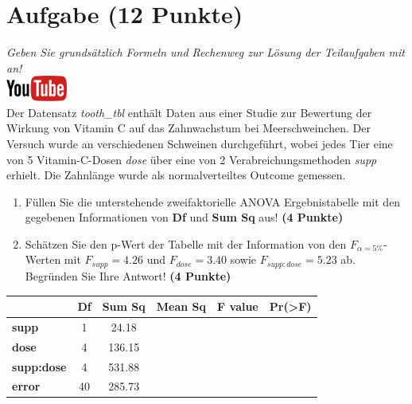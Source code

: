 \documentclass[a4paper, 9pt]{scrartcl}\usepackage[]{graphicx}\usepackage[]{xcolor}
\begin{document}
 
\clearpage

\section{Aufgabe \hfill (12 Punkte)}

\textit{Geben Sie grunds{\"a}tzlich Formeln und Rechenweg zur L{\"o}sung der
  Teilaufgaben mit an!} \\[1Ex]

\hfill\href{https://youtu.be/8Pb2sKUIMyk}{\includegraphics[width =
  2cm]{img/youtube}}\\[1Ex]



Der Datensatz \textit{tooth\_tbl} enth{\"a}lt Daten aus einer Studie zur
Bewertung der Wirkung von Vitamin C auf das Zahnwachstum bei
Meerschweinchen. Der Versuch wurde an verschiedenen Schweinen durchgef{\"u}hrt,
wobei jedes Tier eine von 5 Vitamin-C-Dosen \textit{dose}
{\"u}ber eine von 2 Verabreichungsmethoden \textit{supp}
erhielt. Die Zahnl{\"a}nge wurde als normalverteiltes Outcome gemessen.



\begin{enumerate}
\item F{\"u}llen Sie die unterstehende zweifaktorielle ANOVA Ergebnistabelle 
  mit den gegebenen Informationen von \textbf{Df} und \textbf{Sum Sq} aus!
  \textbf{(4 Punkte)}
\item Sch{\"a}tzen Sie den p-Wert der Tabelle mit der Information von den
  $F_{\alpha = 5\%}$-Werten mit
  $F_{supp} = 4.26$ und
  $F_{dose} = 3.40$ sowie
  $F_{supp:dose} = 5.23$ ab. Begr{\"u}nden Sie Ihre
  Antwort! \textbf{(4 Punkte)}
\end{enumerate}

\vspace{1Ex}

\begin{center}
  \Large
  \begin{tabular}{l|c|c|c|c|c}
     & \textbf{Df} & \textbf{Sum Sq} & \textbf{Mean Sq} & \textbf{F value} & \textbf{Pr(>F)} \strut\\
    \hline
   \textbf{supp}  & 1 & 24.18 &  &  &  \strut\\
    \hline
    \textbf{dose}  & 4 & 136.15 &  &  &  \strut\\
    \hline
    \textbf{supp:dose}  & 4 & 531.88 &  &  &  \strut\\
    \hline
   \textbf{error}  & 40 & 285.73 &  &  &  \strut\\
  \end{tabular}
\end{center}
\end{document}
